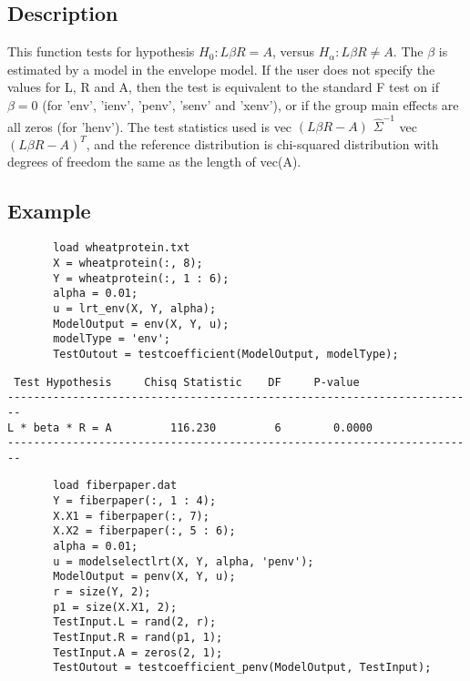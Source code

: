 \documentclass[a4paper,11pt,openany]{memoir}
\begin{document}
\subsection*{Description}

\begin{par}
This function tests for hypothesis $H_0: L\beta R = A$, versus $H_\alpha: L\beta R\neq A$.  The $\beta$ is estimated by a model in the envelope model.  If the user does not specify the values for L, R and A, then the test is equivalent to the standard F test on if $\beta = 0$ (for 'env', 'ienv', 'penv', 'senv' and 'xenv'), or if the group main effects are all zeros (for 'henv').  The test statistics used is vec $(L\beta R - A)$ $\hat{\Sigma}^{-1}$ vec $(L\beta R - A)^{T}$, and the reference distribution is chi-squared distribution with degrees of freedom the same as the length of vec(A).
\end{par} \vspace{1em}


\subsection*{Example}


\begin{verbatim}       load wheatprotein.txt
       X = wheatprotein(:, 8);
       Y = wheatprotein(:, 1 : 6);
       alpha = 0.01;
       u = lrt_env(X, Y, alpha);
       ModelOutput = env(X, Y, u);
       modelType = 'env';
       TestOutout = testcoefficient(ModelOutput, modelType);\end{verbatim}
         \color{lightgray}\ttfamily \begin{verbatim}
 Test Hypothesis     Chisq Statistic    DF     P-value
------------------------------------------------------------------------
L * beta * R = A         116.230         6        0.0000
------------------------------------------------------------------------
\end{verbatim} \rmfamily
\color{black}   
\begin{verbatim}       load fiberpaper.dat
       Y = fiberpaper(:, 1 : 4);
       X.X1 = fiberpaper(:, 7);
       X.X2 = fiberpaper(:, 5 : 6);
       alpha = 0.01;
       u = modelselectlrt(X, Y, alpha, 'penv');
       ModelOutput = penv(X, Y, u);
       r = size(Y, 2);
       p1 = size(X.X1, 2);
       TestInput.L = rand(2, r);
       TestInput.R = rand(p1, 1);
       TestInput.A = zeros(2, 1);
       TestOutout = testcoefficient_penv(ModelOutput, TestInput);\end{verbatim}
    
\end{document}
